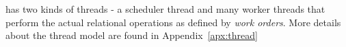 \sys{} has two kinds of threads - a scheduler thread and many worker threads that perform the actual relational operations as defined by \textit{work orders}. 
More details about the thread model are found in Appendix~\ref{apx:thread}

%


